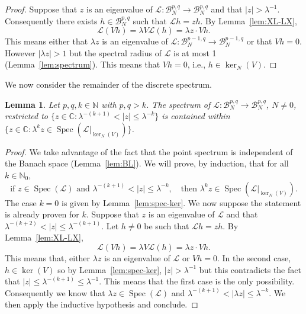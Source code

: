\documentclass[a4paper,11pt]{amsart}
\newtheorem{lemma}[theorem]{Lemma}
\theoremstyle{remark}
\newcommand{\abs}[1]{\left|#1\right|} %
\newcommand{\cB}{\mathcal{B}} %
\newcommand{\bC}{\mathbb{C}} %
\newcommand{\cL}{\mathcal{L}} %
\newcommand{\bN}{\mathbb{N}} %
\newcommand{\dv}{V} %
\newcommand{\spec}[1]{\operatorname{Spec}(#1)} %
\begin{document}
\begin{proof}
    Suppose that \(z\) is an eigenvalue of \(\cL : \cB_{N}^{p,q} \to \cB_{N}^{p,q}\) and that \(\abs{z} > \lambda^{-1}\).
    Consequently there exists \(h \in \cB_{N}^{p,q}\) such that \(\cL h = z h\).
    By Lemma~\ref{lem:XL-LX},
    \[
       \cL (\dv h) = \lambda \dv \cL (h) = \lambda z \cdot \dv h.
    \]
    This means either that \( \lambda z \) is an eigenvalue of \(\cL : \cB_{N}^{p-1,q} \to \cB_{N}^{p-1,q}\)  or that \(\dv h = 0\).
    However \(\abs{\lambda z}>1\) but the spectral radius of \(\cL\) is at most 1 (Lemma~\ref{lem:spectrum}).
    This means that \(\dv h = 0\), i.e., \(h \in \ker_N(\dv)\).
\end{proof}

We now consider the remainder of the discrete spectrum.

\begin{lemma}
    \label{lem:spec-induc}
    Let \(p,q, k\in \bN\) with \(p,q > k\).
    The spectrum of \(\cL : \cB_{N}^{p,q} \to \cB_{N}^{p,q}\), \(N\neq 0\), restricted to \(\{z\in \bC : \lambda^{-(k+1)}< \abs{z}  \leq \lambda^{-k}\}\) is contained within \(\{z\in \bC: \lambda^k z \in \spec{{\left.\cL\right|}_{\ker_N(\dv)}} \}\).
\end{lemma}

\begin{proof}
    We take advantage of the fact that the point spectrum is independent of the Banach space (Lemma~\ref{lem:BL}).
    We will prove, by induction, that for all \(k\in \bN_0\),
    \begin{equation*}
        \text{if \(z \in \spec{\cL}\) and \(\lambda^{-(k+1)}< \abs{z}  \leq \lambda^{-k}\)},
        \quad
        \text{then \(\lambda^k z \in \spec{{\left.\cL\right|}_{\ker_N(\dv)}}\)}.
    \end{equation*}
    The case \(k=0\) is given by Lemma~\ref{lem:spec-ker}.
    We now suppose the statement is already proven for \(k\).
    Suppose that \(z\) is an eigenvalue of \(\cL\) and that \(\lambda^{-(k+2)}< \abs{z}  \leq \lambda^{-(k+1)}\).
    Let \(h \neq 0\) be such that \(\cL h = z h\).
    By Lemma~\ref{lem:XL-LX},
    \[
        \cL (\dv h) = \lambda \dv \cL (h) = \lambda z \cdot \dv h.   
    \]
    This means that, either \( \lambda z \) is an eigenvalue of \(\cL\) or \(\dv h = 0\).
    In the second case, \(h \in \ker(\dv)\) so by Lemma~\ref{lem:spec-ker}, \(\abs{z} > \lambda^{-1}\) but this contradicts the fact that \(\abs{z} \leq \lambda^{-(k+1)} \leq \lambda^{-1}\).
    This means that the first case is the only possibility.
    Consequently we know that \(\lambda z \in \spec{\cL}\) and  \(\lambda^{-(k+1)}< \abs{\lambda z}  \leq \lambda^{-k}\).
    We then apply the inductive hypothesis and conclude.
\end{proof}
\end{document}
